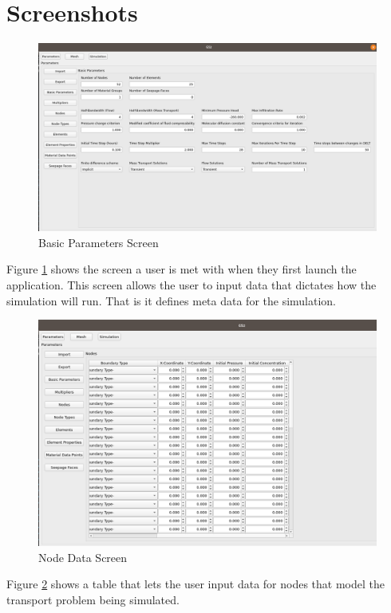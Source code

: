 \documentclass[onecolumn, draftclsnofoot,10pt, compsoc]{IEEEtran}
\begin{document}
\section{Screenshots}
\begin{figure}[H]
    \centering
    \includegraphics[scale=0.3]{basic-parameters.png}
    \caption{Basic Parameters Screen}
    \label{fig:basic-parameters}
\end{figure}{}
Figure \ref{fig:basic-parameters} shows the screen a user is met with when they first launch the application. This screen allows the user to input data that dictates how the simulation will run. That is it defines meta data for the simulation. 
\begin{figure}[H]
    \centering
    \includegraphics[scale=0.3]{node-data.png}
    \caption{Node Data Screen}
    \label{fig:node-data}
\end{figure}{}
Figure \ref{fig:node-data} shows a table that lets the user input data for nodes that model the transport problem being simulated. 
\end{document}
